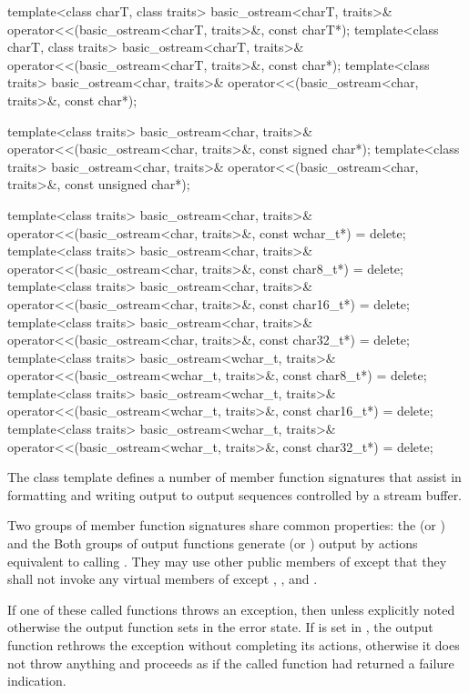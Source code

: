 \begin{codeblock}
{  template<class charT, class traits>
    basic_ostream<charT, traits>& operator<<(basic_ostream<charT, traits>&, const charT*);
  template<class charT, class traits>
    basic_ostream<charT, traits>& operator<<(basic_ostream<charT, traits>&, const char*);
  template<class traits>
    basic_ostream<char, traits>& operator<<(basic_ostream<char, traits>&, const char*);

  template<class traits>
    basic_ostream<char, traits>& operator<<(basic_ostream<char, traits>&, const signed char*);
  template<class traits>
    basic_ostream<char, traits>& operator<<(basic_ostream<char, traits>&, const unsigned char*);

  template<class traits>
    basic_ostream<char, traits>&
      operator<<(basic_ostream<char, traits>&, const wchar_t*) = delete;
  template<class traits>
    basic_ostream<char, traits>&
      operator<<(basic_ostream<char, traits>&, const char8_t*) = delete;
  template<class traits>
    basic_ostream<char, traits>&
      operator<<(basic_ostream<char, traits>&, const char16_t*) = delete;
  template<class traits>
    basic_ostream<char, traits>&
      operator<<(basic_ostream<char, traits>&, const char32_t*) = delete;
  template<class traits>
    basic_ostream<wchar_t, traits>&
      operator<<(basic_ostream<wchar_t, traits>&, const char8_t*) = delete;
  template<class traits>
    basic_ostream<wchar_t, traits>&
      operator<<(basic_ostream<wchar_t, traits>&, const char16_t*) = delete;
  template<class traits>
    basic_ostream<wchar_t, traits>&
      operator<<(basic_ostream<wchar_t, traits>&, const char32_t*) = delete;
}
\end{codeblock}

\pnum
The class template
defines a number of member function
signatures that assist in formatting and writing output to output sequences
controlled by a stream buffer.

\pnum
Two groups of member function signatures share common properties:
the
(or
)
and the
Both groups of output functions generate (or
)
output
by actions equivalent to calling
.
They may use other public members of
except that they shall not invoke any virtual members of
except
,
,
and
.

\pnum
If one of these called functions throws an exception, then unless explicitly noted otherwise
the output function sets
in the error state.
If
is set in
,
the output function
rethrows the exception without completing its actions, otherwise
it does not throw anything and proceeds as if the called function had returned
a failure indication.

